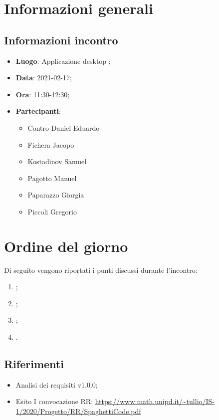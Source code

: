 \documentclass{article}
\begin{document}


\section{Informazioni generali}
\label{sec:info_generali}

\subsection{Informazioni incontro}
\label{sub:info_incontro}

\begin{itemize}
	\item \textbf{Luogo}: Applicazione desktop ;
	\item \textbf{Data}: 2021-02-17;
	\item \textbf{Ora}: 11:30-12:30;
	\item \textbf{Partecipanti}:
	\begin{itemize}
		\item Contro Daniel Eduardo
		\item Fichera Jacopo
		\item Kostadinov Samuel
		\item Pagotto Manuel
		\item Paparazzo Giorgia
		\item Piccoli Gregorio
	\end{itemize}
\end{itemize}

\section{Ordine del giorno}%
\label{sec:ordine_del_giorno}

Di seguito vengono riportati i punti discussi durante l'incontro:
\begin{enumerate}
	\item {};
	\item {};
	\item {};
	\item {}.
\end{enumerate}


\subsection{Riferimenti}%
\label{sub:riferimenti}
\begin{itemize}
    \item Analisi dei requisiti v1.0.0;
	\item Esito I convocazione RR: \url{https://www.math.unipd.it/~tullio/IS-1/2020/Progetto/RR/SpaghettiCode.pdf}
\end{itemize}
\end{document}
